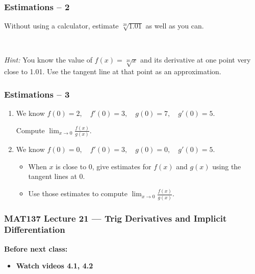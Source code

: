 \documentclass[14pt]{beamer}
\newcommand {\DS} [1] {${\displaystyle #1}$}
\newcommand{\setsize}[1]{\fontsize{#1}{#1}\selectfont} %
\newcommand{\smallerfont}{\setsize{13}} %
\begin{document}
\begin{frame}
\frametitle{Estimations -- 2}


Without using a calculator, estimate \DS{\sqrt[20]{1.01}} as well as you can.

\

\emph{Hint:}  You know the value of \DS{f(x) = \sqrt[20]{x}} and its derivative at one point very close to 1.01.  Use the tangent line at that point as an approximation.
 
\end{frame}
\begin{frame}[t]
\smallerfont
\frametitle{Estimations -- 3}



\begin{enumerate}
\item  We know \quad
	\DS{
		f(0) = 2, \quad f'(0) = 3, \quad g(0) = 7, \quad g'(0) = 5.
	}
	
	\vspace{.2cm}
 	Compute \; \DS{\lim_{x \to 0} \frac{f(x)}{g(x)}}.

\vfill

\item  We know \quad 
	\DS{
		f(0) = 0, \quad f'(0) = 3, \quad g(0) = 0, \quad g'(0) = 5.
	}
	
	\vspace{.2cm}
 	\begin{itemize}
		\item  When $x$ is close to $0$, give estimates for \DS{f(x)} and \DS{g(x)} using the tangent lines at $0$. 
		\item Use those estimates to compute \;  \DS{\lim_{x \to 0} \frac{f(x)}{g(x)}}.
	\end{itemize}
	
\end{enumerate}
 
 \vfill
 
\end{frame}












\begin{frame}
	\frametitle{MAT137 Lecture 21 --- Trig Derivatives and Implicit Differentiation}

	\vfill
	{\bf Before next class:}
		\begin{itemize} \normalsize
			\item {\bf Watch videos 4.1, 4.2 }
		\end{itemize}
\end{frame}
\end{document}
